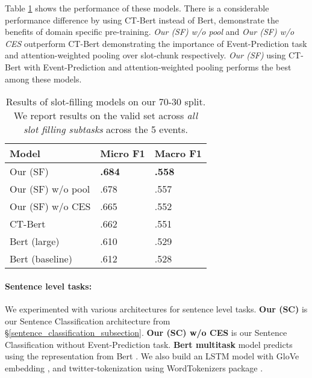 \documentclass[11pt,a4paper]{article}
\begin{document}
Table \ref{Table4:} shows the performance of these models. There is a considerable performance difference by using CT-Bert instead of Bert, demonstrate the benefits of domain specific pre-training.
\textit{Our (SF) w/o pool} and \textit{Our (SF) w/o CES} outperform CT-Bert demonstrating the importance of Event-Prediction task and  attention-weighted pooling over slot-chunk respectively.
\textit{Our (SF)} using CT-Bert with Event-Prediction and attention-weighted pooling performs the best among these models.

\begin{table}
 \begin{center}

  \begin{tabular}{p{3cm}p{1.5cm}p{1.5cm}}
    \hline
    Model & Micro F1 & Macro F1\\
\hline
   Our (SF)          & \textbf{.684} & \textbf{.558} \\
   Our (SF) w/o pool & .678          & .557 \\
   Our (SF) w/o CES  & .665          & .552 \\
   CT-Bert           & .662          & .551 \\
   Bert (large)      & .610          & .529 \\ 
   Bert (baseline)   & .612          & .528 \\ 
   \hline

  \end{tabular}
  \caption{\label{Table4:} Results of slot-filling models on our 70-30 split. We report results on the valid set across \textit{all slot filling subtasks} across the 5 events.}
 \end{center}
\end{table}

\paragraph{Sentence level tasks:}

We experimented with various architectures for sentence level tasks. \textbf{Our (SC)} is our Sentence Classification architecture from \S\ref{sentence_classification_subsection}. \textbf{Our (SC) w/o CES} is our Sentence Classification without Event-Prediction task. \textbf{Bert multitask} model predicts using the  representation from Bert \cite{bertpaper}. We also build an LSTM model \cite{lstmpaper} with GloVe embedding \cite{pennington2014glove}, and twitter-tokenization using WordTokenizers package \cite{worktokenizers}.
\end{document}
